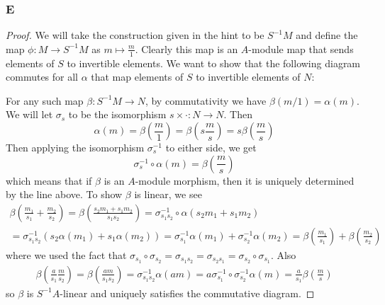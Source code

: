 \documentclass{article}
\begin{document}
\subsubsection{E}\label{1.3.E}
\begin{proof}
    We will take the construction given in the hint to be $S^{-1}M$ and define the map $\phi:M\to S^{-1}M$ as $m\mapsto \frac{m}{1}$. Clearly this map is an $A$-module map that sends elements of $S$ to invertible elements. We want to show that the following diagram commutes for all $\alpha$ that map elements of $S$ to invertible elements of $N$:
    \begin{center}
    \end{center}
    For any such map $\beta:S^{-1}M\to N$, by commutativity we have $\beta(m/1)=\alpha(m)$. We will let $\sigma_s$ to be the isomorphism $s\times \cdot:N\to N$. Then
    \[
    \alpha(m)=\beta(\frac{m}{1})=\beta(s \frac{m}{s})=s\beta(\frac{m}{s})
    \]
    Then applying the isomorphism $\sigma_s^{-1}$ to either side, we get
    \[
    \sigma_s^{-1}\circ \alpha(m)=\beta(\frac{m}{s})
    \]
    which means that if $\beta$ is an $A$-module morphism, then it is uniquely determined by the line above. To show $\beta$ is linear, we see
    \begin{align*}
        \beta(\frac{m_1}{s_1}+\frac{m_2}{s_2})=\beta(\frac{s_2m_1+s_1m_2}{s_1s_2})=\sigma_{s_1s_2}^{-1}\circ \alpha(s_2m_1+s_1m_2)\\
        =\sigma_{s_1s_2}^{-1}(s_2\alpha(m_1)+s_1\alpha(m_2))=\sigma_{s_1}^{-1}\alpha(m_1)+\sigma_{s_2}^{-1}\alpha(m_2)=\beta(\frac{m_1}{s_1})+\beta(\frac{m_2}{s_2})
    \end{align*}
    where we used the fact that $\sigma_{s_1}\circ \sigma_{s_2}=\sigma_{s_1s_2}=\sigma_{s_2s_1}=\sigma_{s_2}\circ \sigma_{s_1}$. Also
    \begin{align*}
        \beta(\frac{a}{s_1} \frac{m}{s_2})=\beta(\frac{am}{s_1s_2})=\sigma_{s_1s_2}^{-1}\alpha(am)=a\sigma_{s_1}^{-1}\circ \sigma_{s_2}^{-1}\alpha(m)=\frac{a}{s_1}\beta(\frac{m}{s})
    \end{align*}
    so $\beta$ is $S^{-1}A$-linear and uniquely satisfies the commutative diagram.
\end{proof}
\end{document}
